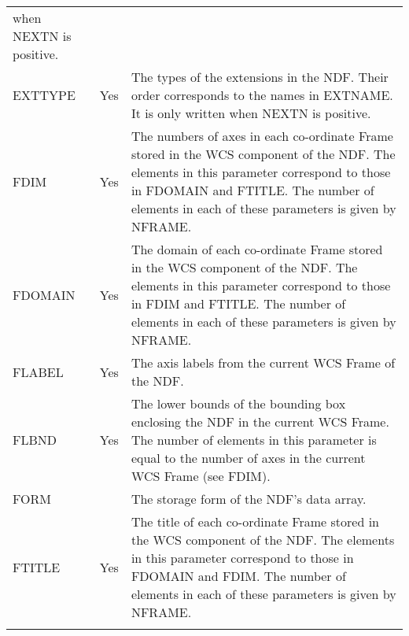 \begin{center}
\begin{tabular}{lcp{112mm}}
                when NEXTN is positive. \\
EXTTYPE & Yes & The types of the extensions in the NDF.  Their order
                corresponds to the names in EXTNAME.  It is only written when
                NEXTN is positive. \\
FDIM & Yes & The numbers of axes in each co-ordinate Frame stored in the WCS
             component of the NDF. The elements in this parameter correspond to
             those in FDOMAIN and FTITLE. The number of elements in
             each of these parameters is given by NFRAME. \\
FDOMAIN & Yes & The domain of each co-ordinate Frame stored in the WCS component
                of the NDF. The elements in this parameter correspond to those in
                FDIM and FTITLE. The number of elements in each of these
                parameters is given by NFRAME. \\
FLABEL & Yes & The axis labels from the current WCS Frame of the NDF. \\ 
FLBND  & Yes & The lower bounds of the bounding box enclosing the NDF in the
               current WCS Frame. The number of elements in this parameter is equal
               to the number of axes in the current WCS Frame (see FDIM).\\
FORM & & The storage form of the NDF's data array. \\
FTITLE & Yes & The title of each co-ordinate Frame stored in the WCS component
                of the NDF. The elements in this parameter correspond to those in
                FDOMAIN and FDIM.  The number of elements in each of these
                parameters is given by NFRAME. \\
\\ \hline
\end{tabular}
\end{center}

